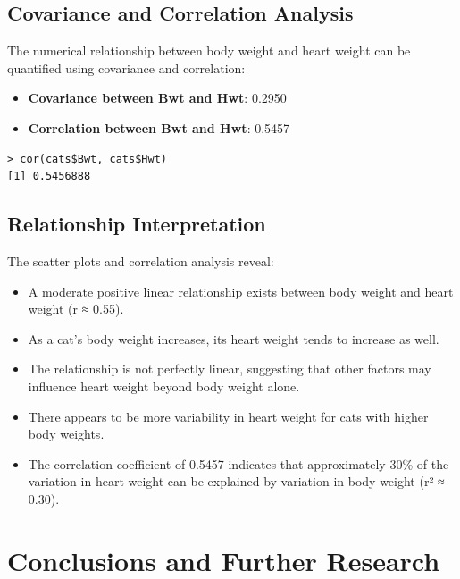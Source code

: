 \documentclass[a4paper,12pt]{article}
\begin{document}
\subsection{Covariance and Correlation Analysis}
\label{subsec:correlation}

The numerical relationship between body weight and heart weight can be quantified using covariance and correlation:

\begin{itemize}[leftmargin=1.5cm]
    \item \textbf{Covariance between Bwt and Hwt}: 0.2950
    \item \textbf{Correlation between Bwt and Hwt}: 0.5457
\end{itemize}

\begin{lstlisting}[caption={Correlation calculation between body weight and heart weight}, label={lst:correlation}]
> cor(cats$Bwt, cats$Hwt)
[1] 0.5456888
\end{lstlisting}

\subsection{Relationship Interpretation}
\label{subsec:relationship_interp}

The scatter plots and correlation analysis reveal:
\begin{itemize}[leftmargin=1.5cm]
    \item A moderate positive linear relationship exists between body weight and heart weight (r ≈ 0.55).
    \item As a cat's body weight increases, its heart weight tends to increase as well.
    \item The relationship is not perfectly linear, suggesting that other factors may influence heart weight beyond body weight alone.
    \item There appears to be more variability in heart weight for cats with higher body weights.
    \item The correlation coefficient of 0.5457 indicates that approximately 30\% of the variation in heart weight can be explained by variation in body weight (r² ≈ 0.30).
\end{itemize}

\section{Conclusions and Further Research}
\label{sec:conclusions}
\end{document}
